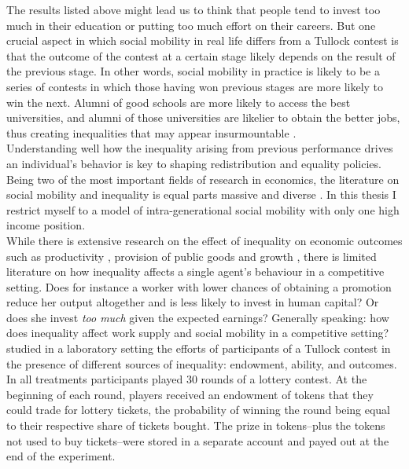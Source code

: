 The results listed above might lead us to think that people tend to invest too much in their education or putting too much effort on their careers. But one crucial aspect in which social mobility in real life differs from a Tullock contest is that the outcome of the contest at a certain stage likely depends on the result of the previous stage. In other words, social mobility in practice is likely to be a series of contests in which those having won previous stages are more likely to win the next. Alumni of good schools are more likely to access the best universities, and alumni of those universities are likelier to obtain the better jobs, thus creating inequalities that may appear insurmountable \citep{sewell1971}.\\

Understanding well how the inequality arising from previous performance drives an individual's behavior is key to shaping redistribution and equality policies. Being two of the most important fields of research in economics, the literature on social mobility and inequality is equal parts massive and diverse \citep{nolan2011, atkinson2015, lipset2018, fields1999}. In this thesis I restrict myself to a model of intra-generational social mobility with only one high income position.\\ 

While there is extensive research on the effect of inequality on economic outcomes such as productivity \citep{persson1994, ku2012}, provision of public goods \citep{fehr1999} and growth \citep{ehrhart2009}, there is limited literature on how inequality affects a single agent's behaviour in a competitive setting. Does for instance a worker with lower chances of obtaining a promotion reduce her output altogether and is less likely to invest in human capital? Or does she invest \textit{too much} given the expected earnings? Generally speaking: how does inequality affect work supply and social mobility in a competitive setting?\\

\cite{fallucchi2017} studied in a laboratory setting the efforts of participants of a Tullock contest in the presence of different sources of inequality: endowment, ability, and outcomes. In all treatments participants played 30 rounds of a lottery contest. At the beginning of each round, players received an endowment of tokens that they could trade for lottery tickets, the probability of winning the round being equal to their respective share of tickets bought. The prize in tokens--plus the tokens not used to buy tickets--were stored in a separate account and payed out at the end of the experiment.\\

